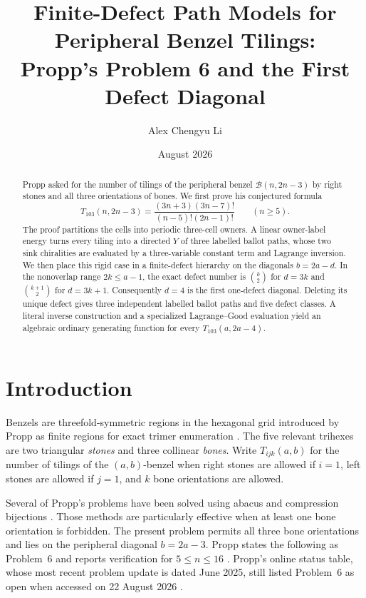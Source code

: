 \documentclass[11pt]{amsart}
\title[Finite-defect peripheral benzel tilings]
{Finite-Defect Path Models for Peripheral Benzel Tilings:\\
Propp's Problem 6 and the First Defect Diagonal}
\author{Alex Chengyu Li}
\date{August 2026}
\theoremstyle{definition}
\newcommand{\Bz}{\mathcal B}
\begin{document}
\begin{abstract}
Propp asked for the number of tilings of the peripheral benzel
$\Bz(n,2n-3)$ by right stones and all three orientations of bones.  We first
prove his conjectured formula
\[
 T_{103}(n,2n-3)
 =\frac{(3n+3)(3n-7)!}{(n-5)!(2n-1)!}\qquad(n\geq5).
\]
The proof partitions the cells into periodic three-cell owners.  A linear
owner-label energy turns every tiling into a directed $Y$ of three labelled
ballot paths, whose two sink chiralities are evaluated by a three-variable
constant term and Lagrange inversion.  We then place this rigid case in a
finite-defect hierarchy on the diagonals $b=2a-d$.  In the nonoverlap range
$2k\le a-1$, the exact defect number is $\binom{k}{2}$ for $d=3k$ and
$\binom{k+1}{2}$ for $d=3k+1$.
Consequently $d=4$ is the first one-defect diagonal.  Deleting its unique
defect gives three independent labelled ballot paths and five defect classes.
A literal inverse construction and a specialized Lagrange--Good evaluation
yield an algebraic ordinary generating function for every
$T_{103}(a,2a-4)$.
\end{abstract}

\maketitle

\section{Introduction}

Benzels are threefold-symmetric regions in the hexagonal grid introduced by
Propp as finite regions for exact trimer enumeration
\cite{ProppProblems}.  The five relevant trihexes are two triangular
\emph{stones} and three collinear \emph{bones}.  Write $T_{ijk}(a,b)$ for
the number of tilings of the $(a,b)$-benzel when right stones are allowed if
$i=1$, left stones are allowed if $j=1$, and $k$ bone orientations are
allowed.

Several of Propp's problems have been solved using abacus and compression
bijections \cite{DLPY,DFLPY}.  Those methods are particularly effective when
at least one bone orientation is forbidden.  The present problem permits all
three bone orientations and lies on the peripheral diagonal $b=2a-3$.
Propp states the following as Problem~6 and reports verification for
$5\leq n\leq16$ \cite{ProppProblems}.  Propp's online status table, whose
most recent problem update is dated June 2025, still listed Problem~6 as open
when accessed on 22 August 2026 \cite{ProppSite}.
\end{document}
